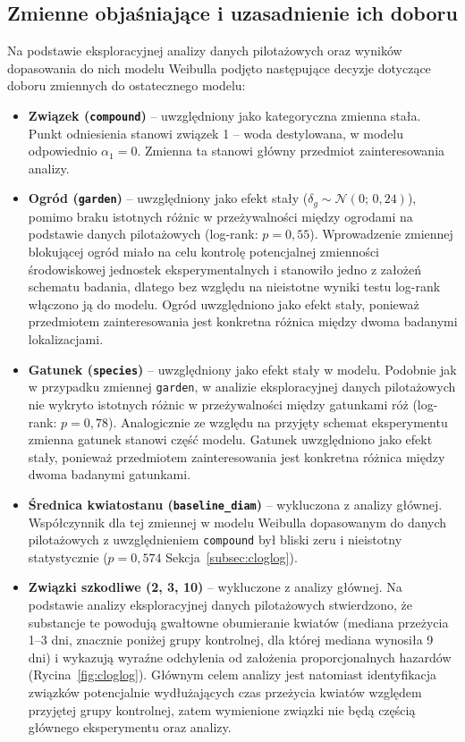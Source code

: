 \documentclass[12pt, a4paper]{article}
\begin{document}
\subsection{Zmienne objaśniające i uzasadnienie ich doboru}

Na podstawie eksploracyjnej analizy danych pilotażowych oraz wyników dopasowania do nich modelu Weibulla podjęto następujące decyzje dotyczące doboru zmiennych do ostatecznego modelu:

\begin{itemize}
    \item \textbf{Związek (\texttt{compound})} -- uwzględniony jako kategoryczna zmienna stała. Punkt odniesienia stanowi związek 1 -- woda destylowana, w modelu odpowiednio $\alpha_1 = 0$. Zmienna ta stanowi główny przedmiot zainteresowania analizy.

    \item \textbf{Ogród (\texttt{garden})} -- uwzględniony jako efekt stały ($\delta_g \sim \mathcal{N}(0;\, 0{,}24)$), pomimo braku istotnych różnic w przeżywalności między ogrodami na podstawie danych pilotażowych (log-rank: $p = 0{,}55$). Wprowadzenie zmiennej blokującej ogród miało na celu kontrolę potencjalnej zmienności środowiskowej jednostek eksperymentalnych i stanowiło jedno z założeń schematu badania, dlatego bez względu na nieistotne wyniki testu log-rank włączono ją do modelu. Ogród uwzględniono jako efekt stały, ponieważ przedmiotem zainteresowania jest konkretna różnica między dwoma badanymi lokalizacjami.

    \item \textbf{Gatunek (\texttt{species})} -- uwzględniony jako efekt stały w modelu. Podobnie jak w przypadku zmiennej \texttt{garden}, w analizie eksploracyjnej danych pilotażowych nie wykryto istotnych różnic w przeżywalności między gatunkami róż (log-rank: $p = 0{,}78$). Analogicznie ze względu na przyjęty schemat eksperymentu zmienna gatunek stanowi część modelu. Gatunek uwzględniono jako efekt stały, ponieważ przedmiotem zainteresowania jest konkretna różnica między dwoma badanymi gatunkami.

    \item \textbf{Średnica kwiatostanu (\texttt{baseline\_diam})} -- wykluczona z analizy głównej. Współczynnik dla tej zmiennej w modelu Weibulla dopasowanym do danych pilotażowych z uwzględnieniem \texttt{compound} był bliski zeru i nieistotny statystycznie ($p = 0{,}574$ Sekcja~\ref{subsec:cloglog}).

    \item \textbf{Związki szkodliwe (2, 3, 10)} -- wykluczone z analizy głównej. Na podstawie analizy eksploracyjnej danych pilotażowych stwierdzono, że substancje te powodują gwałtowne obumieranie kwiatów (mediana przeżycia 1--3 dni, znacznie poniżej grupy kontrolnej, dla której mediana wynosiła 9 dni) i wykazują wyraźne odchylenia od założenia proporcjonalnych hazardów (Rycina~\ref{fig:cloglog}). Głównym celem analizy jest natomiast identyfikacja związków potencjalnie wydłużających czas przeżycia kwiatów względem przyjętej grupy kontrolnej, zatem wymienione związki nie będą częścią głównego eksperymentu oraz analizy.
\end{itemize}
\end{document}
